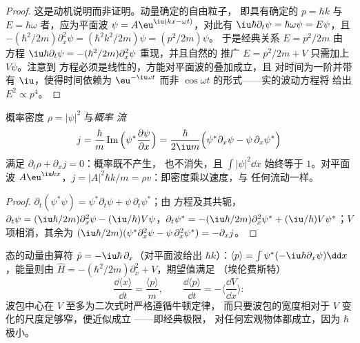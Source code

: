 \begin{proof}
这是动机说明而非证明。动量确定的自由粒子，
即具有确定的 $p = \hbar k$ 与 $E = \hbar\omega$ 者，应为平面波 $\psi =
A\eu^{\iu(kx - \omega t)}$，对此有 $\iu\hbar\partial_t\psi = \hbar\omega\psi =
E\psi$，且 $-(\hbar^2/2m)\partial_x^2\psi = (\hbar^2k^2/2m)\psi = (p^2/2m)\psi$。
于是经典关系 $E = p^2/2m$ 由
方程 $\iu\hbar\partial_t\psi = -(\hbar^2/2m)\partial_x^2\psi$ 重现，并且自然的
推广 $E = p^2/2m + V$ 只需加上 $V\psi$。注意到
方程必须是线性的，方能对平面波的叠加成立，且
对时间为一阶并带有 $\iu$，使得时间依赖为 $\eu^{-\iu\omega t}$ 而非
$\cos\omega t$ 的形式——实的波动方程将
给出 $E^2 \propto p^4$。
\end{proof}

\begin{proposition}[概率守恒]\label{prop:b2:schrodinger-wave-functions:current}
概率密度 $\rho = |\psi|^2$ 与\emph{概率
流}
\[
j = \frac{\hbar}{m}\operatorname{Im}\Big(\psi^*\frac{\partial\psi}{\partial x}\Big)
= \frac{\hbar}{2\iu m}\Big(\psi^*\partial_x\psi - \psi\,\partial_x\psi^*\Big)
\]
满足 $\partial_t\rho + \partial_xj = 0$：概率既不产生，
也不消失，且 $\int|\psi|^2\dd x$ 始终等于 $1$。对平面波
$A\eu^{\iu kx}$，$j = |A|^2\hbar k/m = \rho v$：即密度乘以速度，与
任何流动一样。
\end{proposition}

\begin{proof}
$\partial_t(\psi^*\psi) = \psi^*\partial_t\psi + \psi\,\partial_t\psi^*$；由
方程及其共轭，$\partial_t\psi = (\iu\hbar/2m)\partial_x^2\psi -
(\iu/\hbar)V\psi$，$\partial_t\psi^* = -(\iu\hbar/2m)\partial_x^2\psi^* +
(\iu/\hbar)V\psi^*$；$V$ 项相消，其余为 $(\iu\hbar/2m)(\psi^*
\partial_x^2\psi - \psi\,\partial_x^2\psi^*) = -\partial_xj$。
\end{proof}

\begin{proposition}[动量、期望值与经典极限]\label{prop:b2:schrodinger-wave-functions:ehrenfest}
态的动量由算符 $\hat p =
-\iu\hbar\,\partial_x$（对平面波给出 $\hbar k$）：$\langle
p\rangle = \int\psi^*(-\iu\hbar\partial_x\psi)\dd x$，能量则由 $\hat H
= -(\hbar^2/2m)\partial_x^2 + V$，期望值满足
（埃伦费斯特）
\[
\frac{\dd\langle x\rangle}{\dd t} = \frac{\langle p\rangle}{m}, \qquad
\frac{\dd\langle p\rangle}{\dd t} = -\Big\langle\frac{\dd V}{\dd x}\Big\rangle :
\]
波包中心在 $V$ 至多为二次式时严格遵循牛顿定律，
而只要波包的宽度相对于 $V$ 变化的尺度足够窄，便近似成立
——即经典极限，
对任何宏观物体都成立，因为 $\hbar$ 极小。
\end{proposition}

